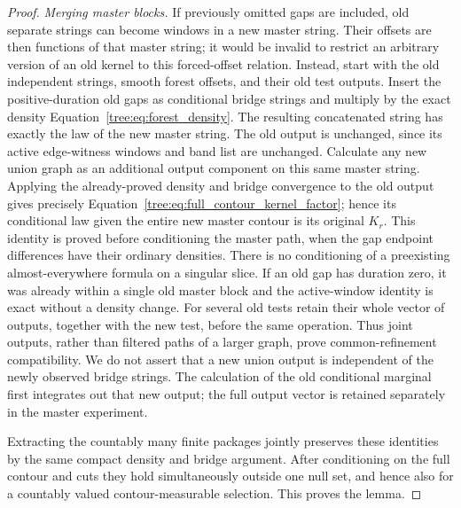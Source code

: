 \begin{proof}
\emph{Merging master blocks.}
If previously omitted
gaps are included, old separate strings can become windows in a new
master string.  Their offsets are then functions of that master
string; it would be invalid to restrict an arbitrary version of an
old kernel to this forced-offset relation.  Instead, start with the
old independent strings, smooth forest offsets, and their old test
outputs.  Insert the positive-duration old gaps as conditional bridge
strings and multiply by the exact density
Equation~\eqref{tree:eq:forest_density}.  The resulting concatenated string
has exactly the law of the new master string.  The old output is
unchanged, since its active edge-witness windows and band list are
unchanged.  Calculate any new union graph as an additional output
component on this same master string.  Applying the already-proved
density and bridge convergence to the old output gives precisely
Equation~\eqref{tree:eq:full_contour_kernel_factor}; hence its conditional
law given the entire new master contour is its original $K_r$.
This identity is proved before conditioning the master path, when
the gap endpoint differences have their ordinary densities.  There
is no conditioning of a preexisting almost-everywhere formula on a
singular slice.  If an old gap has duration zero, it was already
within a single old master block and the active-window identity is
exact without a density change.  For several old tests retain their
whole vector of outputs, together with the new test, before the
same operation.  Thus joint outputs, rather than filtered paths of
a larger graph, prove common-refinement compatibility.
We do not assert that a new union output is independent of the newly
observed bridge strings.  The calculation of the old conditional
marginal first integrates out that new output; the full output
vector is retained separately in the master experiment.

Extracting the countably many finite packages jointly preserves
these identities by the same compact density and bridge argument.  After
conditioning on the full contour and cuts they hold simultaneously
outside one null set, and hence also for a countably valued
contour-measurable selection.  This proves the lemma.
\end{proof}

